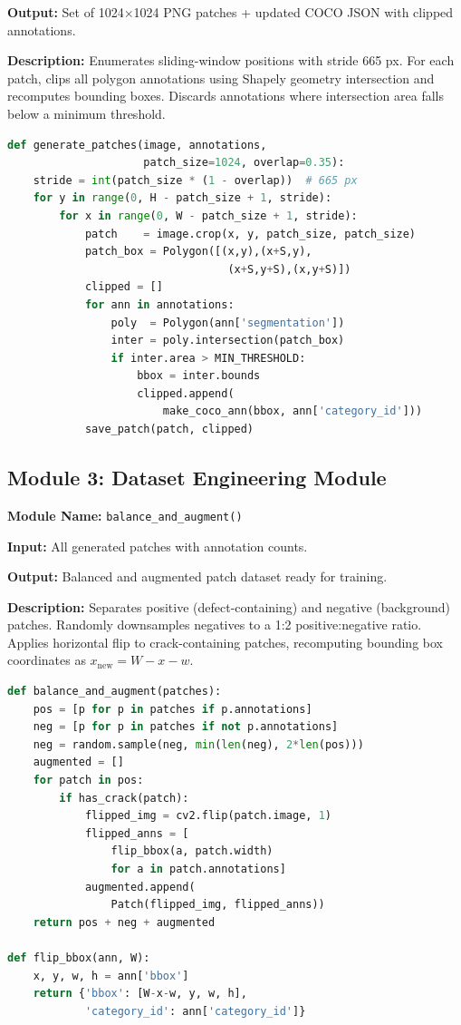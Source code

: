 \textbf{Output:} Set of 1024$\times$1024 PNG patches + updated COCO JSON with clipped annotations.

\textbf{Description:} Enumerates sliding-window positions with stride 665 px. For each patch, clips all polygon annotations using Shapely geometry intersection and recomputes bounding boxes. Discards annotations where intersection area falls below a minimum threshold.

\begin{lstlisting}[language=Python, caption={Patch generation pseudocode}]
def generate_patches(image, annotations,
                     patch_size=1024, overlap=0.35):
    stride = int(patch_size * (1 - overlap))  # 665 px
    for y in range(0, H - patch_size + 1, stride):
        for x in range(0, W - patch_size + 1, stride):
            patch    = image.crop(x, y, patch_size, patch_size)
            patch_box = Polygon([(x,y),(x+S,y),
                                  (x+S,y+S),(x,y+S)])
            clipped = []
            for ann in annotations:
                poly  = Polygon(ann['segmentation'])
                inter = poly.intersection(patch_box)
                if inter.area > MIN_THRESHOLD:
                    bbox = inter.bounds
                    clipped.append(
                        make_coco_ann(bbox, ann['category_id']))
            save_patch(patch, clipped)
\end{lstlisting}

\subsection{Module 3: Dataset Engineering Module}

\textbf{Module Name:} \texttt{balance\_and\_augment()}

\textbf{Input:} All generated patches with annotation counts.

\textbf{Output:} Balanced and augmented patch dataset ready for training.

\textbf{Description:} Separates positive (defect-containing) and negative (background) patches. Randomly downsamples negatives to a 1:2 positive:negative ratio. Applies horizontal flip to crack-containing patches, recomputing bounding box coordinates as $x_{\text{new}} = W - x - w$.

\begin{lstlisting}[language=Python, caption={Balancing and augmentation pseudocode}]
def balance_and_augment(patches):
    pos = [p for p in patches if p.annotations]
    neg = [p for p in patches if not p.annotations]
    neg = random.sample(neg, min(len(neg), 2*len(pos)))
    augmented = []
    for patch in pos:
        if has_crack(patch):
            flipped_img = cv2.flip(patch.image, 1)
            flipped_anns = [
                flip_bbox(a, patch.width)
                for a in patch.annotations]
            augmented.append(
                Patch(flipped_img, flipped_anns))
    return pos + neg + augmented

def flip_bbox(ann, W):
    x, y, w, h = ann['bbox']
    return {'bbox': [W-x-w, y, w, h],
            'category_id': ann['category_id']}
\end{lstlisting}

